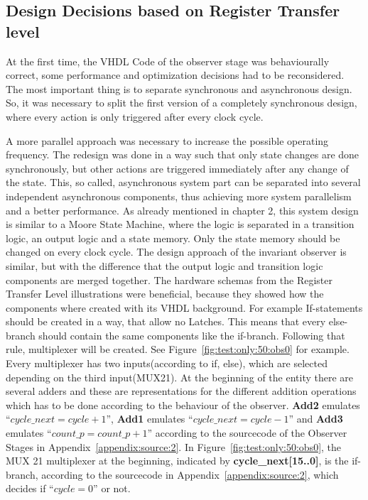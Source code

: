 \subsection{Design Decisions based on Register Transfer level}
\label{chapter:3:section:2:sub:3}
At the first time, the VHDL Code of the observer stage was behaviourally correct, some performance and optimization decisions had to be reconsidered. 
The most important thing is to separate synchronous and asynchronous design. So, it was necessary to split the first version of a completely synchronous design, where
every action is only triggered after every clock cycle. 

A more parallel approach was necessary to increase the possible operating frequency. 
The redesign was done in a way such that only state changes are done synchronously, but other actions are triggered immediately after any change of the state. 
This, so called, asynchronous system part can be separated into several independent asynchronous components, thus achieving more system parallelism and a better performance. 
As already mentioned in  chapter 2, this system design is similar to a Moore State Machine, where the logic is separated in a transition logic, an output logic and a state memory. 
Only the state memory should be changed on every clock cycle.
The design approach of the invariant observer is similar, but with the difference that the output logic and transition logic components are merged together. 
The hardware schemas from the Register Transfer Level illustrations were beneficial, because they showed how the components where created with its VHDL background. 
For example If-statements should be created in a way, that allow no Latches. This means that every else-branch should contain the same components like the if-branch. 
Following that rule, multiplexer will be created. See Figure~\ref{fig:test:only:50:obs0} for example. 
Every multiplexer has two inputs(according to if, else), which are selected depending on the third input(MUX21).
At the beginning of the entity there are several adders and these are representations for the different addition operations
which has to be done according to the behaviour of the observer. \textbf{Add2} emulates ``$cycle\_next=cycle+1$'', \textbf{Add1} emulates ``$cycle\_next=cycle-1$'' and \textbf{Add3}
emulates ``$count\_p=count\_p+1$'' according to the sourcecode of the Observer Stages in Appendix~\ref{appendix:source:2}. 
In Figure~\ref{fig:test:only:50:obs0}, the MUX 21 multiplexer at the beginning, indicated by \textbf{cycle\_next[15..0]}, 
is the if-branch, according to the sourcecode in Appendix~\ref{appendix:source:2}, which decides if ``$cycle=0$'' or not.
